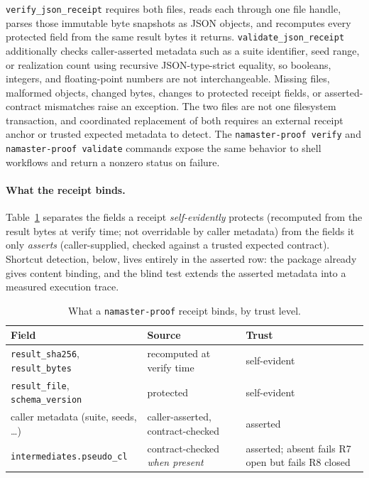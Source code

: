 \documentclass[11pt]{article}
\newcommand{\software}{\texttt{namaster-proof}}
\begin{document}
\texttt{verify\_json\_receipt} requires both files, reads each through one file
handle, parses those immutable byte snapshots as JSON objects, and recomputes
every protected field from the same result bytes it returns.
\texttt{validate\_json\_receipt}
additionally checks caller-asserted metadata such as a suite identifier, seed range,
or realization count using recursive JSON-type-strict equality, so booleans,
integers, and floating-point numbers are not interchangeable. Missing files,
malformed objects, changed bytes,
changes to protected receipt fields, or asserted-contract mismatches raise an exception. The two
files are not one filesystem transaction, and coordinated replacement of both
requires an external receipt anchor or trusted expected metadata to detect. The
\texttt{namaster-proof verify} and \texttt{namaster-proof validate} commands
expose the same behavior to shell workflows and return a nonzero status on
failure.

\paragraph{What the receipt binds.} Table~\ref{tab:receipt-binds} separates the
fields a receipt \emph{self-evidently} protects (recomputed from the result
bytes at verify time; not overridable by caller metadata) from the fields it
only \emph{asserts} (caller-supplied, checked against a trusted expected
contract). Shortcut detection, below, lives entirely in the asserted row: the
package already gives content binding, and the blind test extends the
asserted metadata into a measured execution trace.

\begin{table}[h]
\centering
\caption{What a \software{} receipt binds, by trust level.}
\label{tab:receipt-binds}
\begin{tabular}{@{}lll@{}}
\toprule
Field & Source & Trust \\
\midrule
\texttt{result\_sha256}, \texttt{result\_bytes} & recomputed at verify time & self-evident \\
\texttt{result\_file}, \texttt{schema\_version} & protected & self-evident \\
caller metadata (suite, seeds, \dots) & caller-asserted, contract-checked & asserted \\
\texttt{intermediates.pseudo\_cl} & contract-checked \emph{when present} & asserted; absent fails R7 open but fails R8 closed \\
\bottomrule
\end{tabular}
\end{table}
\end{document}
